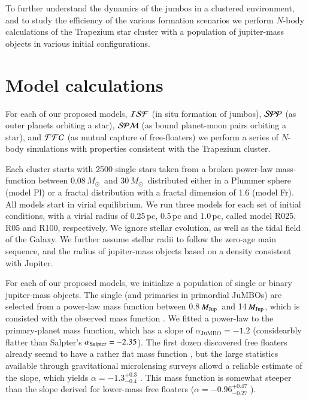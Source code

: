 \documentclass[aa]{lib/aa}
\newcommand{\MSun}{\mbox{${M}_\odot$}}
\newcommand{\MJup}{\mbox{${M}_{\rm Jup}$}}
\newcommand{\jumbo}{\mbox{JuMBO}}
\newcommand{\jumbos}{\mbox{JuMBOs}}
\begin{document}
To further understand the dynamics of the jumbos in a clustered
environment, and to study the efficiency of the various formation
scenarios we perform $N$-body calculations of the Trapezium star
cluster with a population of jupiter-mass objects in various initial
configurations.

\section{Model calculations}

For each of our proposed models, ${\cal ISF}$ (in situ formation of
jumbos), ${\cal SPP}$ (as outer planets orbiting a star), ${\cal SPM}$
(as bound planet-moon pairs orbiting a star), and ${\cal FFC}$ (as
mutual capture of free-floaters) we perform a series of $N$-body
simulations with properties consistent with the Trapezium cluster.

Each cluster starts with 2500 single stars taken from a broken
power-law mass-function \citep{2002Sci...295...82K} between
0.08\,\MSun\, and $30$\,\MSun\, distributed either in a Plummer sphere
(model Pl) or a fractal distribution with a fractal dimension of 1.6
(model Fr). All models start in virial equilibrium.  We run three
models for each set of initial conditions, with a virial radius of
0.25\,pc, 0.5\,pc and 1.0\,pc, called model R025, R05 and R100,
respectively.  We ignore stellar evolution, as well as the tidal field
of the Galaxy. We further assume stellar radii to follow the zero-age
main sequence, and the radius of jupiter-mass objects based on a
density consistent with Jupiter.

For each of our proposed models, we initialize a population of single
or binary jupiter-mass objects. The single (and primaries in
primordial \jumbos) are selected from a power-law mass function
between 0.8\,\MJup\, and 14\,\MJup, which is consisted with the
observed mass function \citep{2023arXiv231001231P}. We fitted a
power-law to the primary-planet mass function, which has a slope of
$\alpha_{\jumbo} =-1.2$ (considearbly flatter than Salpter's
$\alpha_{\rm Salpter} = -2.35$).  The first dozen discovered free
floaters already seemd to have a rather flat mass function
\cite{2000MNRAS.314..858L}, but the large statistics available through
gravitational microlensing surveys allowd a reliable estimate of the
slope, which yields $\alpha = -1.3^{+0.3}_{-0.4}$
\cite{2011Natur.473..349S}. This mass function is somewhat steeper
than the slope derived for lower-mass free floaters ($\alpha =
-0.96^{+0.47}_{-0.27}$ \citep{2023AJ....166..108S}).
\end{document}
